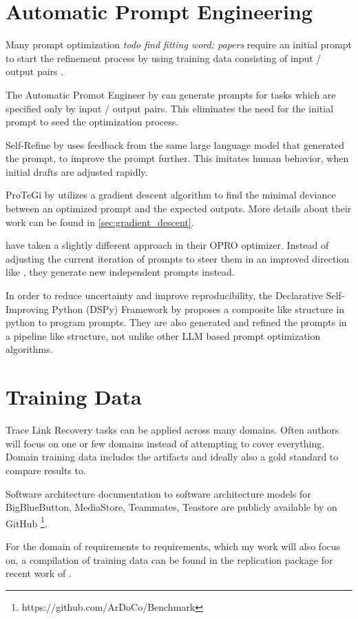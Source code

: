 \section{Automatic Prompt Engineering}
\label{related:sec:ape}
Many prompt optimization \textit{todo find fitting word: papers} require an initial prompt to start the refinement process by using training data consisting of input / output pairs \cite{ramnath2025SystematicSurvey}.

The Automatic Promot Engineer by  can generate prompts for tasks which are specified only by input / output pairs. This eliminates the need for the initial prompt to seed the optimization process.

Self-Refine by  uses feedback from the same large language model that generated the prompt, to improve the prompt further. This imitates human behavior, when initial drafts are adjusted rapidly. 

ProTeGi by  utilizes a gradient descent algorithm to find the minimal deviance between an optimized prompt and the expected outputs. More details about their work can be found in \ref{sec:gradient_descent}.

 have taken a slightly different approach in their OPRO optimizer. Instead of adjusting the current iteration of prompts to steer them in an improved direction like \citeauthor{pryzant2023AutomaticPrompt}, they generate new independent prompts instead.

In order to reduce uncertainty and improve reproducibility, the Declarative Self-Improving Python (DSPy) Framework by  proposes a composite like structure in python to program prompts. They are also generated and refined the prompts in a pipeline like structure, not unlike other LLM based prompt optimization algorithms. 

\section{Training Data}
Trace Link Recovery tasks can be applied across many domains. Often authors will focus on one or few domains instead of attempting to cover everything. Domain training data includes the artifacts and ideally also a gold standard to compare results to.

Software architecture documentation to software architecture models for BigBlueButton, MediaStore, Teammates, Teastore are publicly available by  on GitHub \footnote{https://github.com/ArDoCo/Benchmark}.

For the domain of requirements to requirements, which my work will also focus on, a compilation of training data can be found in the replication package\cite{hey2025ReplicationPackage} for recent work of \citeauthor{hey2025RequirementsTraceability}.